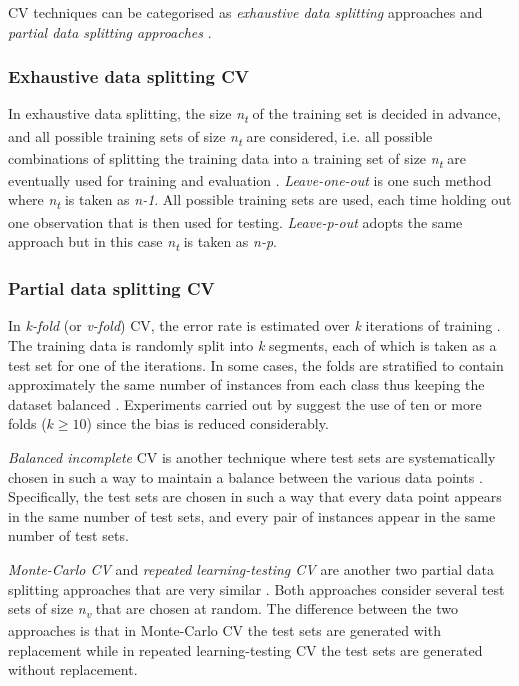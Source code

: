 \documentclass{article}[paper=a4,pagesize=auto,10pt]
\begin{document}
CV techniques can be categorised as \textit{exhaustive data splitting} approaches and \textit{partial data splitting approaches} \cite{arlot2010survey}.

\subsubsection{Exhaustive data splitting CV} \label{Exhaustive data splitting CV}

In exhaustive data splitting, the size \textit{n\textsubscript{t}} of the training set is decided in advance, and all possible training sets of size \textit{n\textsubscript{t}} are considered, i.e. all possible combinations of splitting the training data into a training set of size \textit{n\textsubscript{t}} are eventually used for training and evaluation \cite{arlot2010survey}. \textit{Leave-one-out} is one such method where \textit{n\textsubscript{t}} is taken as \textit{n-1}. All possible training sets are used, each time holding out one observation that is then used for testing.  \textit{Leave-p-out} adopts the same approach but in this case \textit{n\textsubscript{t}} is taken as \textit{n-p}.

\subsubsection{Partial data splitting CV} \label{Partial data splitting CV}

In \textit{k-fold} (or \textit{v-fold}) CV, the error rate is estimated over \textit{k} iterations of training \cite{arlot2010survey}. The training data is randomly split into \textit{k} segments, each of which is taken as a test set for one of the iterations. In some cases, the folds are stratified to contain approximately the same number of instances from each class thus keeping the dataset balanced \cite{kohavi2001}.  Experiments carried out by \cite{kohavi2001} suggest the use of ten or more folds ($k\geq10$) since the bias is reduced considerably. \medskip

\textit{Balanced incomplete} CV is another technique where test sets are systematically chosen in such a way to maintain a balance between the various data points \cite{shao1993linear}. Specifically, the test sets are chosen in such a way that every data point appears in the same number of test sets, and every pair of instances appear in the same number of test sets. \medskip

\textit{Monte-Carlo CV} and \textit{repeated learning-testing CV} are another two partial data splitting approaches that are very similar \cite{arlot2010survey}. Both approaches consider several test sets of size \textit{n\textsubscript{v}} that are chosen at random. The difference between the two approaches is that in Monte-Carlo CV the test sets are generated with replacement while in repeated learning-testing CV the test sets are generated without replacement.
\end{document}

